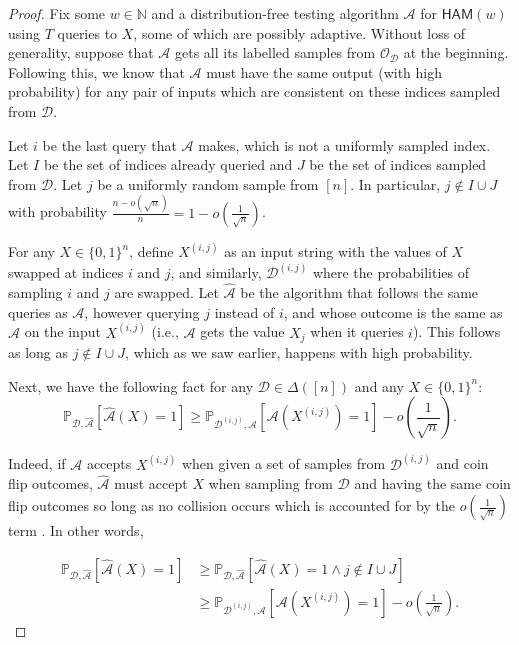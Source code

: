 \documentclass[10pt,a4paper]{article}
\newcommand{\HAM}{\mathsf{HAM}}
\newcommand{\N}{\mathbb{N}}
\newcommand{\sD}{\mathcal{D}}
\newcommand{\sO}{\mathcal{O}}
\newcommand{\sA}{\mathcal{A}}
\begin{document}
\begin{proof}
Fix some $w \in \N$ and a distribution-free testing algorithm $\mathcal{A}$ for $\HAM(w)$ using $T$ queries to $X$, some of which are possibly adaptive. Without loss of generality, suppose that $\sA$ gets all its labelled samples from $\sO_\sD$ at the beginning. Following this, we know that $\sA$ must have the same output (with high probability) for any pair of inputs which are consistent on these indices sampled from $\sD$. 

Let $i$ be the last query that $\sA$ makes, which is not a uniformly sampled index. Let $I$ be the set of indices already queried and $J$ be the set of indices sampled from $\mathcal{D}$. Let $j$ be a uniformly random sample from $[n]$. In particular, $j \notin I \cup J$ with probability $\frac{n-o(\sqrt{n})}{n}=1-o(\frac{1}{\sqrt{n}})$.

For any $X\in\{0,1\}^{n}$, define $X^{(i,j)}$ as an input string with the values of $X$ swapped at indices $i$ and $j$, and similarly, $\mathcal{D}^{(i,j)}$ where the probabilities of sampling $i$ and $j$ are swapped. Let $\hat{\sA}$ be the algorithm that follows the same queries as $\mathcal{A}$, however querying $j$ instead of $i$, and whose outcome is the same as $\mathcal{A}$ on the input $X^{(i,j)}$ (i.e., $\sA$ gets the value $X_j$ when it queries $i$). This follows as long as $j\not\in I\cup J$, which as we saw earlier, happens with high probability.

Next, we have the following fact for any $\mathcal{D}\in \Delta([n])$ and any $X \in\{0,1\}^{n}$: 
\begin{equation}
\label{eq:ij_swap}
    \mathbb{P}_{\mathcal{D}, \hat{\mathcal{A}}}\left[\mathcal{\hat{\sA}}(X)=1\right]\geq\mathbb{P}_{\mathcal{D}^{(i,j)},\mathcal{A}}\left[\mathcal{A}(X^{(i,j)})=1\right]-o\left(\frac{1}{\sqrt{n}}\right).
\end{equation}

Indeed, if $\mathcal{A}$ accepts $X^{(i,j)}$ when given a set of samples from $\sD^{(i,j)}$ and coin flip outcomes, $\hat{\mathcal{A}}$ must accept $X$ when sampling from $\sD$ and having the same coin flip outcomes so long as no collision occurs which is accounted for by the $o \left( \frac{1}{\sqrt{n}} \right)$ term . In other words,

\[
\begin{split}
    \mathbb{P}_{\mathcal{D}, \hat{\mathcal{A}}}\left[\mathcal{\hat{\sA}}(X)=1\right] &\geq \mathbb{P}_{\mathcal{D}, \hat{\mathcal{A}}}\left[\mathcal{\hat{\sA}}(X)=1 \wedge j\not\in I\cup J\right]\\
    &\geq\mathbb{P}_{\mathcal{D}^{(i,j)},\mathcal{A}}\left[\mathcal{A}(X^{(i,j)})=1\right]-o\left(\frac{1}{\sqrt{n}}\right).
\end{split}
\]


\end{proof}
\end{document}
